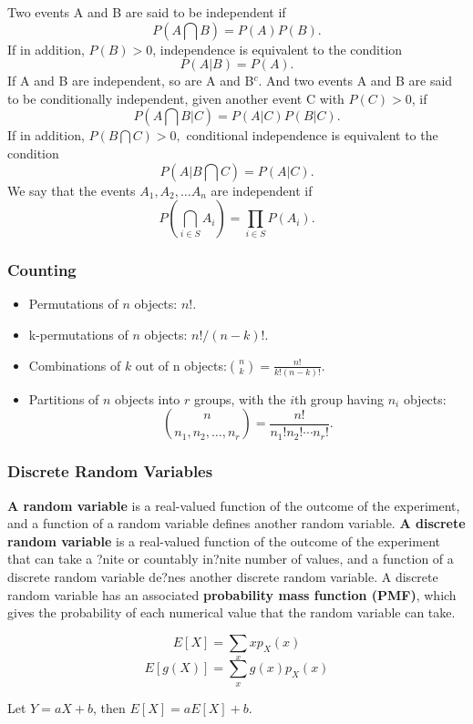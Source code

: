 \documentclass{article}
\begin{document}
Two events A and B are said to be independent if \[P(A\bigcap B) = P(A)P(B).\]If in addition, $P(B) > 0$, independence is equivalent to the condition \[P(A|B) = P(A).\]If A and B are independent, so are A and B$^c$.
And two events A and B are said to be conditionally independent, given another event C with $P(C) > 0$, if \[P(A\bigcap B|C) = P(A|C)P(B|C).\]If in addition, $P(B\bigcap C) > 0,$ conditional independence is equivalent to the condition \[P(A|B\bigcap C) = P(A|C).\]
We say that the events $A_1, A_2,\ldots A_n$ are independent if \[P(\bigcap\limits_{i\in S} A_i) = \prod\limits_{i\in S} P(A_i).\]

\subsubsection{Counting}

\begin{itemize}
\item

Permutations of $n$ objects: $n!$.
\item

k-permutations of $n$ objects: $n!/(n - k)!$.
\item

Combinations of $k$ out of n objects:$\binom{n}{k} = \frac{n!}{k!(n-k)!}.$
\item

Partitions of $n$ objects into $r$ groups, with the $i$th group having $n_i$ objects:
\[\binom{n}{n_1,n_2,\ldots,n_r} = \frac{n!}{n_1!n_2!\cdots n_r!}.\]
\end{itemize}
\subsubsection{Discrete Random Variables}

\textbf{A random variable} is a real-valued function of the outcome of the experiment, and a function of a random variable defines another random variable. \textbf{A discrete random variable} is a real-valued function of the outcome of the experiment that can take a ?nite or countably in?nite number of values, and a function of a discrete random variable de?nes another discrete random variable. A discrete random variable has an associated \textbf{probability mass function (PMF)}, which gives the probability of each numerical value that the random variable can take.

\[E[X] = \sum\limits_{x}xp_{X}(x)\]
\[E[g(X)] = \sum\limits_{x}g(x)p_{X}(x)\]
\begin{center}
Let $Y = aX +b$, then $E[X] = aE[X] + b$.
\end{center}
\end{document}
